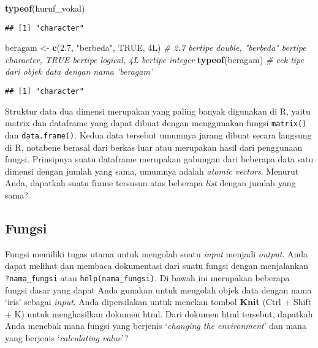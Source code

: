 \documentclass[]{article}
\newenvironment{Shaded}{\begin{snugshade}}{\end{snugshade}}
\newcommand{\KeywordTok}[1]{\textcolor[rgb]{0.13,0.29,0.53}{\textbf{#1}}}
\newcommand{\FloatTok}[1]{\textcolor[rgb]{0.00,0.00,0.81}{#1}}
\newcommand{\StringTok}[1]{\textcolor[rgb]{0.31,0.60,0.02}{#1}}
\newcommand{\CommentTok}[1]{\textcolor[rgb]{0.56,0.35,0.01}{\textit{#1}}}
\newcommand{\OtherTok}[1]{\textcolor[rgb]{0.56,0.35,0.01}{#1}}
\newcommand{\NormalTok}[1]{#1}
\begin{document}
\begin{Shaded}
\begin{Highlighting}[]
\KeywordTok{typeof}\NormalTok{(huruf_vokal)}
\end{Highlighting}
\end{Shaded}

\begin{verbatim}
## [1] "character"
\end{verbatim}

\begin{Shaded}
\begin{Highlighting}[]
\NormalTok{beragam <-}\StringTok{ }\KeywordTok{c}\NormalTok{(}\FloatTok{2.7}\NormalTok{, }\StringTok{"berbeda"}\NormalTok{, }\OtherTok{TRUE}\NormalTok{, 4L) }\CommentTok{# 2.7 bertipe double, "berbeda" bertipe character, TRUE bertipe logical, 4L bertipe integer}
\KeywordTok{typeof}\NormalTok{(beragam) }\CommentTok{# cek tipe dari objek data dengan nama 'beragam'}
\end{Highlighting}
\end{Shaded}

\begin{verbatim}
## [1] "character"
\end{verbatim}

Struktur data dua dimensi merupakan yang paling banyak digunakan di R,
yaitu matrix dan dataframe yang dapat dibuat dengan menggunakan fungsi
\texttt{matrix()} dan \texttt{data.frame()}. Kedua data tersebut umumnya
jarang dibuat secara langsung di R, notabene berasal dari berkas luar
atau merupakan hasil dari penggunaan fungsi. Prinsipnya suatu dataframe
merupakan gabungan dari beberapa data satu dimensi dengan jumlah yang
sama, umumnya adalah \emph{atomic vectors}. Menurut Anda, dapatkah suatu
frame tersusun atas beberapa \emph{list} dengan jumlah yang sama?

\subsection{Fungsi}\label{fungsi}

Fungsi memiliki tugas utama untuk mengolah suatu \emph{input} menjadi
\emph{output}. Anda dapat melihat dan membaca dokumentasi dari suatu
fungsi dengan menjalankan \texttt{?nama\_fungsi} atau
\texttt{help(nama\_fungsi)}. Di bawah ini merupakan beberapa fungsi
dasar yang dapat Anda gunakan untuk mengolah objek data dengan nama
`iris' sebagai \emph{input}. Anda dipersilakan untuk menekan tombol
\textbf{Knit} (Ctrl + Shift + K) untuk menghasilkan dokumen html. Dari
dokumen html tersebut, dapatkah Anda menebak mana fungsi yang berjenis
`\emph{changing the environment}' dan mana yang berjenis
`\emph{calculating value}'?
\end{document}
